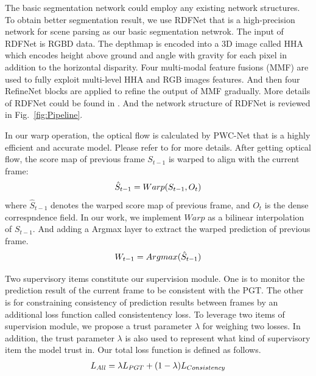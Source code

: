 The basic segmentation network could employ any existing network structures. 
%
To obtain better segmentation result, we use RDFNet\cite{Park2017} that is a high-precision network for scene parsing as our basic segmentation netwrok. 
%
The input of RDFNet is RGBD data. 
%
The depthmap is encoded into a 3D image called HHA which encodes height above ground and angle with gravity for each pixel in addition to the horizontal disparity.
%
Four multi-modal feature fusions (MMF) are used to fully exploit multi-level HHA and RGB images features.
%
And then four RefineNet blocks are applied to refine the output of MMF gradually.
%
More details of RDFNet could be found in \cite{Park2017}. 
%
And the network structure of RDFNet is reviewed in Fig.~\ref{fig:Pipeline}.

In our warp operation, the optical flow is calculated by PWC-Net \cite{Sun2018} that is a highly efficient and accurate model.
%
Please refer to \cite{Sun2018} for more details.
%
After getting optical flow, the score map of previous frame ${S_{t-1}}$ is warped to align with the current frame:
\begin{equation}
\centering
\hat{S}_{t-1}=Warp(S_{t-1},O_t)
\end{equation}
where ${\hat{S}_{t-1}}$ denotes the warped score map of previous frame, and ${O_t}$ is the dense correspndence field. 
%
In our work, we implement ${Warp}$ as a bilinear interpolation of $S_{t-1}$.
%
And adding a Argmax layer to extract the warped prediction of previous frame.
\begin{equation}
\centering
W_{t-1}=Argmax(\hat{S}_{t-1})
\end{equation}

Two supervisory items constitute our supervision module.
%
One is to monitor the prediction result of the current frame to be consistent with the PGT.
%
The other is for constraining consistency of prediction results between frames by an additional loss function called consistentency loss. 
%
To leverage two items of supervision module, we propose a trust parameter ${\lambda}$ for weighing two losses. 
%
In addition, the trust parameter ${\lambda}$ is also used to represent what kind of supervisory item the model trust in.
%
Our total loss function is defined as follows.
\begin{equation}
\centering
\begin{aligned}
L_{All}= \lambda L_{PGT} +(1-\lambda)L_{Consistency}
\end{aligned}
\end{equation}

